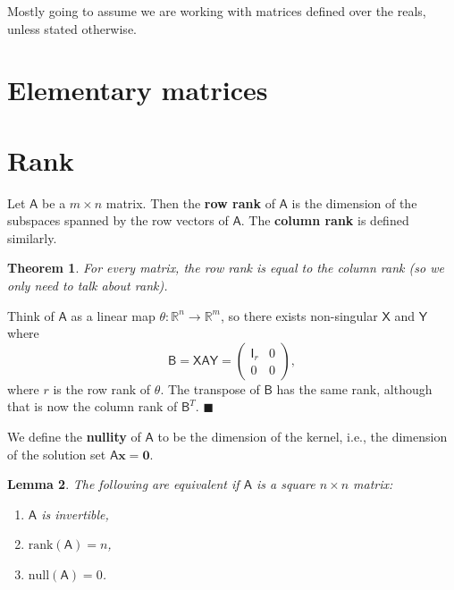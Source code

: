 \documentclass[letter-paper]{tufte-book}
\newtheorem{theorem}{\color{pastel-blue}Theorem}[section]
\newtheorem{lemma}[theorem]{\color{pastel-blue}Lemma}
\newenvironment{proof}[1][Proof]{\begin{trivlist}
\item[\hskip \labelsep {\bfseries #1}]}{\end{trivlist}}
\newcommand{\qed}{\hfill$\blacksquare$}
\begin{document}
Mostly going to assume we are working with matrices defined over the reals,
unless stated otherwise.


\section{Elementary matrices}


\section{Rank}

Let $\mathsf{A}$ be a $m\times n$ matrix. Then the \textbf{row rank} of
$\mathsf{A}$ is the dimension of the subspaces spanned by the row vectors of
$\mathsf{A}$. The \textbf{column rank} is defined similarly.

\begin{theorem}
  For every matrix, the row rank is equal to the column rank (so we only need to
  talk about \emph{rank}).
\end{theorem}

\begin{proof}
  Think of $\mathsf{A}$ as a linear map $\theta: \mathbb{R}^n \to \mathbb{R}^m$,
  so there exists non-singular $\mathsf{X}$ and $\mathsf{Y}$ where
  \begin{equation*}
    \mathsf{B} = \mathsf{XAY} = \begin{pmatrix}\mathsf{I}_r & 0 \\ 0 & 0 \end{pmatrix},
  \end{equation*}
  where $r$ is the row rank of $\theta$. The transpose of $\mathsf{B}$ has the
  same rank, although that is now the column rank of $\mathsf{B}^T$. \qed
\end{proof}

We define the \textbf{nullity} of $\mathsf{A}$ to be the dimension of the
kernel, i.e., the dimension of the solution set $\mathsf{A}\boldsymbol{x} =
\boldsymbol{0}$.

\begin{lemma}
  The following are equivalent if $\mathsf{A}$ is a square $n\times n$ matrix:
  \begin{enumerate}
    \item $\mathsf{A}$ is invertible,
    \item $\mbox{rank}(\mathsf{A}) = n$,
    \item $\mbox{null}(\mathsf{A}) = 0$.
  \end{enumerate}
\end{lemma}
\end{document}
